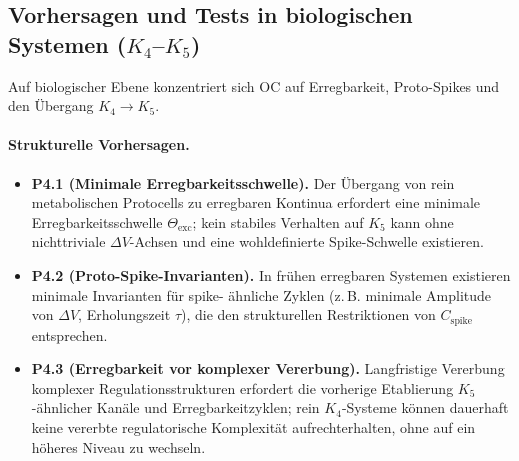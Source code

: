 {%
\subsection{Vorhersagen und Tests in biologischen Systemen
            (\texorpdfstring{$K_4$}{K\_4}--\texorpdfstring{$K_5$}{K\_5})}

Auf biologischer Ebene konzentriert sich OC auf Erregbarkeit, Proto-Spikes und den
Übergang \(K_4 \to K_5\).

\paragraph{Strukturelle Vorhersagen.}
\begin{itemize}
  \item \textbf{P4.1 (Minimale Erregbarkeitsschwelle).}
        Der Übergang von rein metabolischen Protocells zu erregbaren Kontinua
        erfordert eine minimale Erregbarkeitsschwelle \(\Theta_{\mathrm{exc}}\);
        kein stabiles Verhalten auf \(K_5\) kann ohne nichttriviale
        \(\Delta V\)-Achsen und eine wohldefinierte Spike-Schwelle existieren.
  \item \textbf{P4.2 (Proto-Spike-Invarianten).}
        In frühen erregbaren Systemen existieren minimale Invarianten für spike-
        ähnliche Zyklen (z.\,B. minimale Amplitude von \(\Delta V\),
        Erholungszeit \(\tau\)), die den strukturellen Restriktionen von
        \(C_{\mathrm{spike}}\) entsprechen.
  \item \textbf{P4.3 (Erregbarkeit vor komplexer Vererbung).}
        Langfristige Vererbung komplexer Regulationsstrukturen erfordert
        die vorherige Etablierung \(K_5\)-ähnlicher Kanäle und
        Erregbarkeitzyklen; rein \(K_4\)-Systeme können dauerhaft keine
        vererbte regulatorische Komplexität aufrechterhalten,
        ohne auf ein höheres Niveau zu wechseln.
\end{itemize}

}
